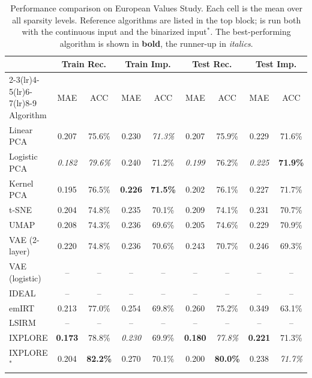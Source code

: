\begin{table}[ht]
\centering
\caption{Performance comparison on European Values Study. Each cell is the mean over all sparsity levels. Reference algorithms are listed in the top block; \IXPLORE is run both with the continuous input and the binarized input$^*$. The best-performing algorithm is shown in \textbf{bold}, the runner-up in \textit{italics}.}
\label{tab:baseline_evs}
\small
\begin{tabular}{lcccccccc}
\toprule
 & \multicolumn{2}{c}{Train Rec.} & \multicolumn{2}{c}{Train Imp.} & \multicolumn{2}{c}{Test Rec.} & \multicolumn{2}{c}{Test Imp.} \\
\cmidrule(lr){2-3}\cmidrule(lr){4-5}\cmidrule(lr){6-7}\cmidrule(lr){8-9}
Algorithm & MAE & ACC & MAE & ACC & MAE & ACC & MAE & ACC \\
\midrule
Linear PCA & 0.207 & 75.6\% & 0.230 & \textit{71.3\%} & 0.207 & 75.9\% & 0.229 & 71.6\% \\
Logistic PCA & \textit{0.182} & \textit{79.6\%} & 0.240 & 71.2\% & \textit{0.199} & 76.2\% & \textit{0.225} & \textbf{71.9\%} \\
Kernel PCA & 0.195 & 76.5\% & \textbf{0.226} & \textbf{71.5\%} & 0.202 & 76.1\% & 0.227 & 71.7\% \\
t-SNE & 0.204 & 74.8\% & 0.235 & 70.1\% & 0.209 & 74.1\% & 0.231 & 70.7\% \\
UMAP & 0.208 & 74.3\% & 0.236 & 69.6\% & 0.205 & 74.6\% & 0.229 & 70.9\% \\
VAE (2-layer) & 0.220 & 74.8\% & 0.236 & 70.6\% & 0.243 & 70.7\% & 0.246 & 69.3\% \\
VAE (logistic) & -- & -- & -- & -- & -- & -- & -- & -- \\
IDEAL & -- & -- & -- & -- & -- & -- & -- & -- \\
emIRT & 0.213 & 77.0\% & 0.254 & 69.8\% & 0.260 & 75.2\% & 0.349 & 63.1\% \\
LSIRM & -- & -- & -- & -- & -- & -- & -- & -- \\
\midrule
IXPLORE & \textbf{0.173} & 78.8\% & \textit{0.230} & 69.9\% & \textbf{0.180} & \textit{77.8\%} & \textbf{0.221} & 71.3\% \\
IXPLORE$^*$ & 0.204 & \textbf{82.2\%} & 0.270 & 70.1\% & 0.200 & \textbf{80.0\%} & 0.238 & \textit{71.7\%} \\
\bottomrule
\end{tabular}
\end{table}
